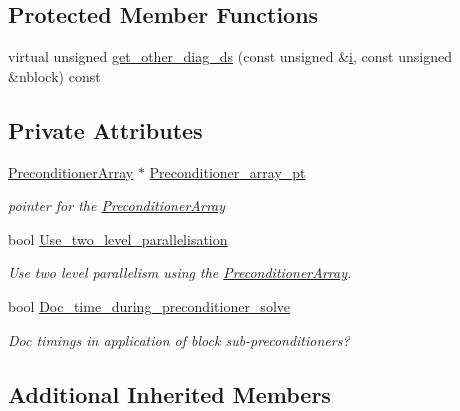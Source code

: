 \subsection*{Protected Member Functions}
\begin{DoxyCompactItemize}
\item 
virtual unsigned \hyperlink{classoomph_1_1BlockDiagonalPreconditioner_acb723bba0b200adc25c9df9003c09205}{get\+\_\+other\+\_\+diag\+\_\+ds} (const unsigned \&\hyperlink{cfortran_8h_adb50e893b86b3e55e751a42eab3cba82}{i}, const unsigned \&nblock) const
\end{DoxyCompactItemize}
\subsection*{Private Attributes}
\begin{DoxyCompactItemize}
\item 
\hyperlink{classoomph_1_1PreconditionerArray}{Preconditioner\+Array} $\ast$ \hyperlink{classoomph_1_1BlockDiagonalPreconditioner_ad792607cd44b8162e4fc612c0b2ac2b2}{Preconditioner\+\_\+array\+\_\+pt}
\begin{DoxyCompactList}\small\item\em pointer for the \hyperlink{classoomph_1_1PreconditionerArray}{Preconditioner\+Array} \end{DoxyCompactList}\item 
bool \hyperlink{classoomph_1_1BlockDiagonalPreconditioner_af4a6531103c85abb57c22b839f77f60c}{Use\+\_\+two\+\_\+level\+\_\+parallelisation}
\begin{DoxyCompactList}\small\item\em Use two level parallelism using the \hyperlink{classoomph_1_1PreconditionerArray}{Preconditioner\+Array}. \end{DoxyCompactList}\item 
bool \hyperlink{classoomph_1_1BlockDiagonalPreconditioner_a71c6dc36aa7c6689eb1e4767a250bc8b}{Doc\+\_\+time\+\_\+during\+\_\+preconditioner\+\_\+solve}
\begin{DoxyCompactList}\small\item\em Doc timings in application of block sub-\/preconditioners? \end{DoxyCompactList}\end{DoxyCompactItemize}
\subsection*{Additional Inherited Members}


